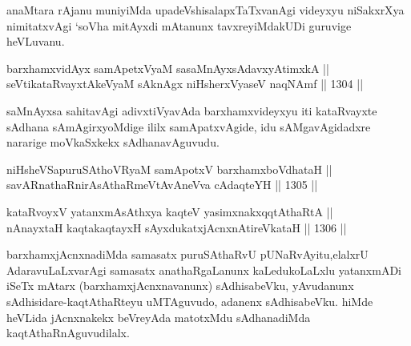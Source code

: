 \begin{artha}
anaMtara rAjanu muniyiMda upadeVshisalapxTaTxvanAgi videyxyu niSakxrXya nimitatxvAgi `soV\s ha mitAyxdi mAtanunx tavxreyiMdakUDi guruvige heVLuvanu.
\end{artha}


\begin{shl}
barxhamxvidAyx samApetxVyaM sasaMnAyxsA\s davxyAtimxkA || \\
seVtikataRvayxtAkeVyaM sAknAgx niHsherxVyaseV naqNAmf \hfill || 1304 ||  
\end{shl}

\begin{artha}
saMnAyxsa sahitavAgi adivxtiVyavAda barxhamxvideyxyu iti kataRvayxte sAdhana sAmAgirxyoMdige ililx samApatxvAgide, idu sAMgavAgidadxre nararige moVkaSxkekx sAdhanavAguvudu.
\end{artha}




\begin{shl}	
niHsheVSapuruSAthoVR\s yaM samApotxV barxhamxboVdhataH || \\
savARnathaRnirAsAthaRmeVtAvAneVva cA\s \s daqteYH \hfill || 1305 ||  
\end{shl}
				
\begin{shl}
kataRvoyxV yatanxmAsAthxya kaqteV yasimxnakxqqtAthaRtA || \\
nAnayxtaH kaqtakaqtayxH sAyxdukatxjAcnxnAtireVkataH \hfill || 1306 ||  
\end{shl}

\begin{artha}
barxhamxjAcnxnadiMda samasatx puruSAthaRvU pUNaRvAyitu,\break elalxrU AdaravuLaLxvarAgi samasatx anathaRgaLanunx kaLedukoLaLxlu yatanxmADi iSeTx mAtarx (barxhamxjAcnxnavanunx) sAdhisabeVku, yAvudanunx sAdhisidare-kaqtAthaRteyu uMTAguvudo, adanenx sAdhisabeVku. hiMde heVLida jAcnxnakekx beVreyAda matotxMdu sAdhanadiMda kaqtAthaRnAguvudilalx.
\end{artha}



